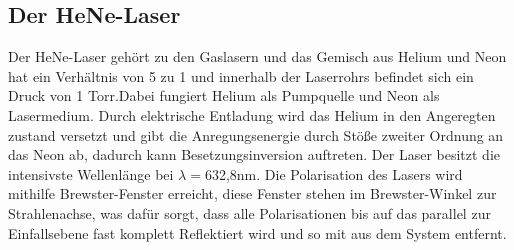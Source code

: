 \subsection{Der HeNe-Laser}
Der HeNe-Laser gehört zu den Gaslasern und das Gemisch aus Helium und Neon hat ein Verhältnis von 5 zu 1 und innerhalb der Laserrohrs befindet sich ein Druck von 1 Torr.Dabei fungiert Helium als Pumpquelle und Neon als Lasermedium. Durch elektrische Entladung wird das Helium in den Angeregten zustand versetzt und gibt die Anregungsenergie durch Stöße zweiter Ordnung an das Neon ab, dadurch kann Besetzungsinversion auftreten. Der Laser besitzt die intensivste Wellenlänge bei $\lambda=$632,8nm.
Die Polarisation des Lasers wird mithilfe Brewster-Fenster erreicht, diese Fenster stehen im Brewster-Winkel zur Strahlenachse, was dafür sorgt, dass alle Polarisationen  bis auf das parallel zur Einfallsebene fast komplett Reflektiert wird und so mit aus dem System entfernt.
